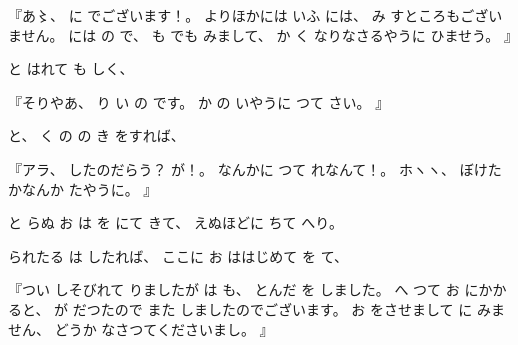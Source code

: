 %
『あ〻、%
%
に
でございます！。
%
よりほかには
いふ
には、
%
み
すところもございません。
%
には
の
で、%
%
も
でも
みまして、
%
か
く
なりなさるやうに
ひませう。
』

%
と
はれて
も
しく、

%
『そりやあ、
%
り
い
の
です。
%
か
の
いやうに
つて
さい。
』

%
と、
%
く
の
の
き
をすれば、

%
『アラ、
%
したのだらう？\inhibitglue{}%
が！。
%
なんかに%
つて
れなんて！。
%
ホヽヽ、
%
ぼけた
かなんか
たやうに。
』

%
と
らぬ
お
は
を
にて
きて、
%
えぬほどに
ちて
へり。

%
られたる
は
したれば、
%
ここに
お
ははじめて
を
て、

%
『つい
しそびれて
りましたが
は
も、
%
とんだ
を
しました。
%
へ
つて
お
にかかると、
%
が
だつたので
また
しましたのでございます。
%
お
をさせまして
に
みません、
%
どうか
なさつてくださいまし。
』

